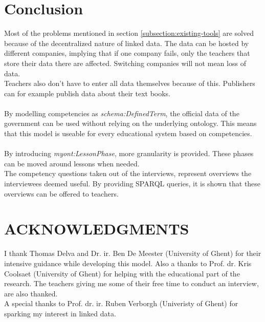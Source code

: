 \documentclass[12pt,journal]{IEEEtran}
\begin{document}
\section{Conclusion}

\noindent Most of the problems mentioned in section \ref{subsection:existing-tools} are solved because of the decentralized nature of linked data.
The data can be hosted by different companies, implying that if one company fails, only the teachers that store their data there are affected.
Switching companies will not mean loss of data.\\
Teachers also don't have to enter all data themselves because of this. Publishers can for example publish data about their text books.\\ \\
By modelling competencies as \textit{schema:DefinedTerm}, the official data of the government can be used without relying on the underlying ontology.
This means that this model is useable for every educational system based on competencies.\\ \\
By introducing \textit{myont:LessonPhase}, more granularity is provided. These phases can be moved around lessons when needed.\\
The competency questions taken out of the interviews, represent overviews the interviewees deemed useful.
By providing SPARQL queries, it is shown that these overviews can be offered to teachers.

\section*{ACKNOWLEDGMENTS}
\noindent I thank Thomas Delva and Dr. ir. Ben De Meester (University of Ghent) for their intensive guidance while developing this model.
Also a thanks to Prof. dr. Kris Coolsaet (University of Ghent) for helping with the educational part of the research.
The teachers giving me some of their free time to conduct an interview, are also thanked.\\
A special thanks to Prof. dr. ir. Ruben Verborgh (Univeristy of Ghent) for sparking my interest in linked data.



\end{document}
